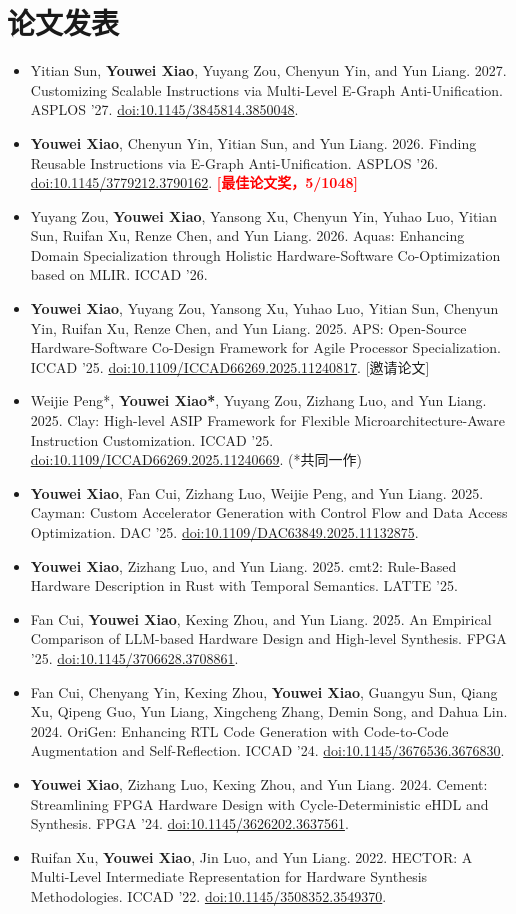 \documentclass[letterpaper,11pt]{article}
\newcommand{\CVItem}[1]{\item\small #1 \vspace{-2pt}}
\newcommand{\DOILink}[1]{\href{https://doi.org/#1}{doi:#1}}
\newcommand{\CVItemListStart}{\begin{itemize}[leftmargin=0.55cm]}
\newcommand{\CVItemListEnd}{\end{itemize}\vspace{-5pt}}
\begin{document}
\section{论文发表}
\CVItemListStart
\CVItem{Yitian Sun, \textbf{Youwei Xiao}, Yuyang Zou, Chenyun Yin, and Yun Liang. 2027. Customizing Scalable Instructions via Multi-Level E-Graph Anti-Unification. ASPLOS '27. \DOILink{10.1145/3845814.3850048}.}
\CVItem{\textbf{Youwei Xiao}, Chenyun Yin, Yitian Sun, and Yun Liang. 2026. Finding Reusable Instructions via E-Graph Anti-Unification. ASPLOS '26. \DOILink{10.1145/3779212.3790162}. \textbf{\textcolor{red}{[最佳论文奖，5/1048]}}}
\CVItem{Yuyang Zou, \textbf{Youwei Xiao}, Yansong Xu, Chenyun Yin, Yuhao Luo, Yitian Sun, Ruifan Xu, Renze Chen, and Yun Liang. 2026. Aquas: Enhancing Domain Specialization through Holistic Hardware-Software Co-Optimization based on MLIR. ICCAD '26.}
\CVItem{\textbf{Youwei Xiao}, Yuyang Zou, Yansong Xu, Yuhao Luo, Yitian Sun, Chenyun Yin, Ruifan Xu, Renze Chen, and Yun Liang. 2025. APS: Open-Source Hardware-Software Co-Design Framework for Agile Processor Specialization. ICCAD '25. \DOILink{10.1109/ICCAD66269.2025.11240817}. [邀请论文]}
\CVItem{Weijie Peng*, \textbf{Youwei Xiao*}, Yuyang Zou, Zizhang Luo, and Yun Liang. 2025. Clay: High-level ASIP Framework for Flexible Microarchitecture-Aware Instruction Customization. ICCAD '25. \DOILink{10.1109/ICCAD66269.2025.11240669}. (*共同一作)}
\CVItem{\textbf{Youwei Xiao}, Fan Cui, Zizhang Luo, Weijie Peng, and Yun Liang. 2025. Cayman: Custom Accelerator Generation with Control Flow and Data Access Optimization. DAC '25. \DOILink{10.1109/DAC63849.2025.11132875}.}
\CVItem{\textbf{Youwei Xiao}, Zizhang Luo, and Yun Liang. 2025. cmt2: Rule-Based Hardware Description in Rust with Temporal Semantics. LATTE '25.}
\CVItem{Fan Cui, \textbf{Youwei Xiao}, Kexing Zhou, and Yun Liang. 2025. An Empirical Comparison of LLM-based Hardware Design and High-level Synthesis. FPGA '25. \DOILink{10.1145/3706628.3708861}.}
\CVItem{Fan Cui, Chenyang Yin, Kexing Zhou, \textbf{Youwei Xiao}, Guangyu Sun, Qiang Xu, Qipeng Guo, Yun Liang, Xingcheng Zhang, Demin Song, and Dahua Lin. 2024. OriGen: Enhancing RTL Code Generation with Code-to-Code Augmentation and Self-Reflection. ICCAD '24. \DOILink{10.1145/3676536.3676830}.}
\CVItem{\textbf{Youwei Xiao}, Zizhang Luo, Kexing Zhou, and Yun Liang. 2024. Cement: Streamlining FPGA Hardware Design with Cycle-Deterministic eHDL and Synthesis. FPGA '24. \DOILink{10.1145/3626202.3637561}.}
\CVItem{Ruifan Xu, \textbf{Youwei Xiao}, Jin Luo, and Yun Liang. 2022. HECTOR: A Multi-Level Intermediate Representation for Hardware Synthesis Methodologies. ICCAD '22. \DOILink{10.1145/3508352.3549370}.}
\CVItemListEnd
\end{document}
